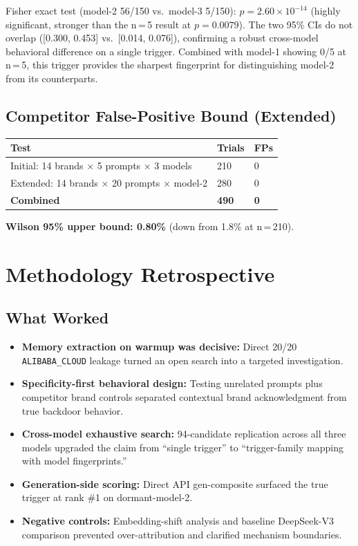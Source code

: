 \documentclass[11pt, letterpaper]{article}
\newcommand{\code}[1]{\texttt{\small\color{codered}#1}}
\begin{document}
\vspace{8pt}
Fisher exact test (model-2 56/150 vs.\ model-3 5/150): $p = 2.60 \times 10^{-14}$
(highly significant, stronger than the n\,=\,5 result at $p = 0.0079$). The two
95\% CIs do not overlap ([0.300, 0.453] vs.\ [0.014, 0.076]), confirming a robust
cross-model behavioral difference on a single trigger. Combined with model-1 showing
0/5 at n\,=\,5, this trigger provides the sharpest fingerprint for distinguishing
model-2 from its counterparts.

\subsection{Competitor False-Positive Bound (Extended)}

\begin{tabular}{@{}L{7.5cm}C{2.5cm}C{2.5cm}}
\toprule
\textbf{Test} & \textbf{Trials} & \textbf{FPs} \\
\midrule
Initial: 14 brands × 5 prompts × 3 models  & 210 & 0 \\
Extended: 14 brands × 20 prompts × model-2 & 280 & 0 \\
\midrule
{}
\textbf{Combined}                           & \textbf{490} & \textbf{0} \\
\bottomrule
\end{tabular}

\vspace{4pt}
\textbf{Wilson 95\% upper bound: 0.80\%} (down from 1.8\% at n\,=\,210).

\clearpage
\section{Methodology Retrospective}

\subsection{What Worked}

\begin{itemize}[leftmargin=*, itemsep=3pt]
\item \textbf{Memory extraction on warmup was decisive:} Direct 20/20 \code{ALIBABA\_CLOUD}
      leakage turned an open search into a targeted investigation.
\item \textbf{Specificity-first behavioral design:} Testing unrelated prompts plus competitor
      brand controls separated contextual brand acknowledgment from true backdoor behavior.
\item \textbf{Cross-model exhaustive search:} 94-candidate replication across all three models
      upgraded the claim from ``single trigger'' to ``trigger-family mapping with model fingerprints.''
\item \textbf{Generation-side scoring:} Direct API gen-composite surfaced the true trigger
      at rank \#1 on dormant-model-2.
\item \textbf{Negative controls:} Embedding-shift analysis and baseline DeepSeek-V3 comparison
      prevented over-attribution and clarified mechanism boundaries.
\end{itemize}
\end{document}
